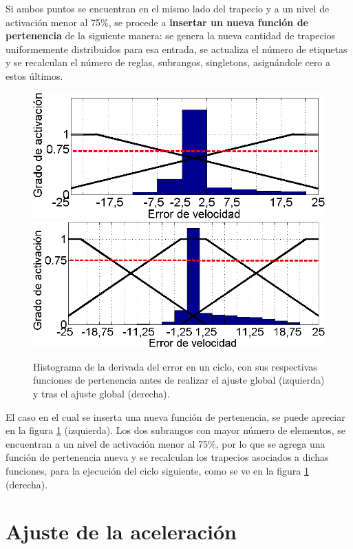Si ambos puntos se encuentran en el mismo lado del trapecio y a un nivel de activación menor al 75\%, se procede a \textbf{insertar un nueva función de pertenencia} de la siguiente manera: se genera la nueva cantidad de trapecios uniformemente distribuidos para esa entrada, se actualiza el número de etiquetas y se recalculan el número de reglas, subrangos, singletons, asignándole cero a estos últimos. 

\begin{figure}[h]
\centering
\includegraphics[width=0.45\linewidth,type=png,ext=.png,read=.png]{figures/label21}\hspace{0.5cm} \includegraphics[width=0.45\linewidth,type=png,ext=.png,read=.png]{figures/label22}
\caption{Histograma de la derivada del error en un ciclo, con sus respectivas funciones de pertenencia antes de realizar el ajuste global (izquierda) y tras el ajuste global (derecha).}
\label{fig:label21}
\end{figure} 

El caso en el cual se inserta una nueva función de pertenencia, se puede apreciar en la figura \ref{fig:label21} (izquierda). Los dos subrangos con mayor número de elementos, se encuentran a un nivel de activación menor al 75\%, por lo que se agrega una función de pertenencia nueva y se recalculan los trapecios asociados a dichas funciones, para la ejecución del ciclo siguiente, como se ve en la figura \ref{fig:label21} (derecha). 




\section{Ajuste de la aceleración}
\label{sec:ajuste}

